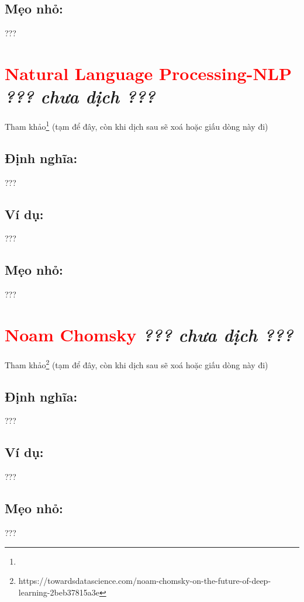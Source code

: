 \subsection*{Mẹo nhỏ:}
???
\section*{\huge \textcolor{Red}{Natural Language Processing-NLP}  \small \textit{??? chưa dịch ???} }
Tham khảo\footnote{} (tạm để đây, còn khi dịch sau sẽ xoá hoặc giấu dòng này đi)
\subsection*{Định nghĩa:}
???
\subsection*{Ví dụ:}
???
\subsection*{Mẹo nhỏ:}
???
\section*{\huge \textcolor{Red}{Noam Chomsky}  \small \textit{??? chưa dịch ???} }
Tham khảo\footnote{https://towardsdatascience.com/noam-chomsky-on-the-future-of-deep-learning-2beb37815a3e} (tạm để đây, còn khi dịch sau sẽ xoá hoặc giấu dòng này đi)
\subsection*{Định nghĩa:}
???
\subsection*{Ví dụ:}
???
\subsection*{Mẹo nhỏ:}
???
